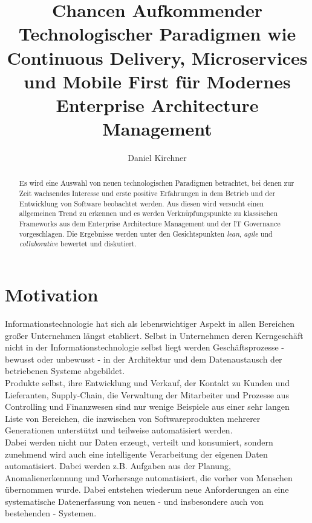 \documentclass{llncs}
\begin{document}
\title{Chancen Aufkommender Technologischer Paradigmen wie Continuous Delivery, Microservices und Mobile First für Modernes Enterprise Architecture Management}
\author{Daniel Kirchner}
\maketitle
%
\begin{abstract}
Es wird eine Auswahl von neuen technologischen Paradigmen betrachtet, bei denen zur Zeit wachsendes Interesse und erste positive Erfahrungen in dem Betrieb und der Entwicklung von Software beobachtet werden.
Aus diesen wird versucht einen allgemeinen Trend zu erkennen und es werden Verknüpfungspunkte zu klassischen Frameworks aus dem Enterprise Architecture Management und der IT Governance vorgeschlagen.
Die Ergebnisse werden unter den Gesichtspunkten \textit{lean}, \textit{agile} und \textit{collaborative} bewertet und diskutiert.
\end{abstract}
%
\section{Motivation}
%
Informationstechnologie hat sich als lebenswichtiger Aspekt in allen Bereichen großer Unternehmen längst etabliert. Selbst in Unternehmen deren Kerngeschäft nicht in der Informationstechnologie selbst liegt werden Geschäftsprozesse - bewusst oder unbewusst - in der Architektur und dem Datenaustausch der betriebenen Systeme abgebildet.\\

Produkte selbst, ihre Entwicklung und Verkauf, der Kontakt zu Kunden und Lieferanten, Supply-Chain, die Verwaltung der Mitarbeiter und Prozesse aus Controlling und Finanzwesen sind nur wenige Beispiele aus einer sehr langen Liste von Bereichen, die inzwischen von Softwareprodukten mehrerer Generationen unterstützt und teilweise automatisiert werden.\\

Dabei werden nicht nur Daten erzeugt, verteilt und konsumiert, sondern zunehmend wird auch eine intelligente Verarbeitung der eigenen Daten automatisiert. Dabei werden z.B. Aufgaben aus der Planung, Anomalienerkennung und Vorhersage automatisiert, die vorher von Menschen übernommen wurde. Dabei entstehen wiederum neue Anforderungen an eine systematische Datenerfassung von neuen - und insbesondere auch von bestehenden - Systemen.\\
\end{document}

